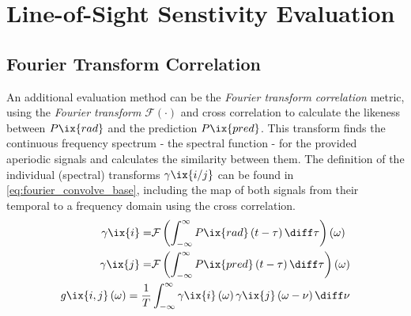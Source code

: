 \chapter{Line-of-Sight Senstivity Evaluation}%
%
    \section{Fourier Transform Correlation}\label{sec:fouriercorrelate}%
%
        An additional evaluation method can be the \textit{Fourier transform correlation} metric, using the \textit{Fourier transform} $\mathcal{F}\left(\cdot\right)$ and cross correlation to calculate the likeness between $P\ix{rad}$ and the prediction $P\ix{pred}$. This transform finds the continuous frequency spectrum - the spectral function - for the provided aperiodic signals and calculates the similarity between them. The definition of the individual (spectral) transforms $\gamma\ix{i/j}$ can be found in \cref{eq:fourier_convolve_base}, including the map of both signals from their temporal to a frequency domain using the cross correlation.%
%
        \begin{align}%
            \begin{split}\label{eq:fourier_convolve_base}%
                \gamma\ix{i}=&\mathcal{F}\left(\int_{-\infty}^{\infty}P\ix{rad}\left(t-\tau\right)\diff\tau\right)\left(\omega\right)\\%
                \gamma\ix{j}=&\mathcal{F}\left(\int_{-\infty}^{\infty}P\ix{pred}\left(t-\tau\right)\diff\tau\right)\left(\omega\right)\\%
                g\ix{i,j}\left(\omega\right)=\frac{1}{T}&\int_{-\infty}^{\infty}\gamma\ix{i}\left(\omega\right)\gamma\ix{j}\left(\omega-\nu\right)\diff\nu%
            \end{split}%
        \end{align}%
%
